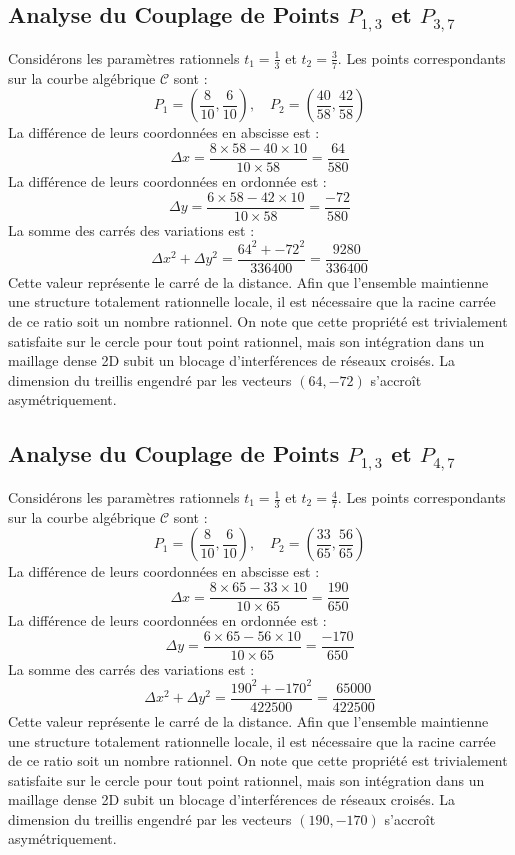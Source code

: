 \documentclass[12pt, a4paper]{article}
\begin{document}
\subsection{Analyse du Couplage de Points $P_{1,3}$ et $P_{3,7}$}
Considérons les paramètres rationnels $t_1 = \frac{1}{3}$ et $t_2 = \frac{3}{7}$.
Les points correspondants sur la courbe algébrique $\mathcal{C}$ sont :
$$ P_1 = \left( \frac{8}{10}, \frac{6}{10} \right), \quad P_2 = \left( \frac{40}{58}, \frac{42}{58} \right) $$
La différence de leurs coordonnées en abscisse est :
$$ \Delta x = \frac{8 \times 58 - 40 \times 10}{10 \times 58} = \frac{64}{580} $$
La différence de leurs coordonnées en ordonnée est :
$$ \Delta y = \frac{6 \times 58 - 42 \times 10}{10 \times 58} = \frac{-72}{580} $$
La somme des carrés des variations est :
$$ \Delta x^2 + \Delta y^2 = \frac{ 64^2 + -72^2 }{ 336400 } = \frac{ 9280 }{ 336400 } $$
Cette valeur représente le carré de la distance. Afin que l'ensemble maintienne une structure totalement rationnelle locale, il est nécessaire que la racine carrée de ce ratio soit un nombre rationnel. On note que cette propriété est trivialement satisfaite sur le cercle pour tout point rationnel, mais son intégration dans un maillage dense 2D subit un blocage d'interférences de réseaux croisés. La dimension du treillis engendré par les vecteurs $( 64, -72 )$ s'accroît asymétriquement.


\subsection{Analyse du Couplage de Points $P_{1,3}$ et $P_{4,7}$}
Considérons les paramètres rationnels $t_1 = \frac{1}{3}$ et $t_2 = \frac{4}{7}$.
Les points correspondants sur la courbe algébrique $\mathcal{C}$ sont :
$$ P_1 = \left( \frac{8}{10}, \frac{6}{10} \right), \quad P_2 = \left( \frac{33}{65}, \frac{56}{65} \right) $$
La différence de leurs coordonnées en abscisse est :
$$ \Delta x = \frac{8 \times 65 - 33 \times 10}{10 \times 65} = \frac{190}{650} $$
La différence de leurs coordonnées en ordonnée est :
$$ \Delta y = \frac{6 \times 65 - 56 \times 10}{10 \times 65} = \frac{-170}{650} $$
La somme des carrés des variations est :
$$ \Delta x^2 + \Delta y^2 = \frac{ 190^2 + -170^2 }{ 422500 } = \frac{ 65000 }{ 422500 } $$
Cette valeur représente le carré de la distance. Afin que l'ensemble maintienne une structure totalement rationnelle locale, il est nécessaire que la racine carrée de ce ratio soit un nombre rationnel. On note que cette propriété est trivialement satisfaite sur le cercle pour tout point rationnel, mais son intégration dans un maillage dense 2D subit un blocage d'interférences de réseaux croisés. La dimension du treillis engendré par les vecteurs $( 190, -170 )$ s'accroît asymétriquement.
\end{document}
